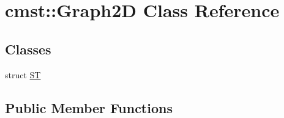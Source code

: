 \hypertarget{classcmst_1_1_graph2_d}{}\section{cmst\+:\+:Graph2D Class Reference}
\label{classcmst_1_1_graph2_d}
\subsection*{Classes}
\begin{DoxyCompactItemize}
\item 
struct \hyperlink{structcmst_1_1_graph2_d_1_1_s_t}{ST}
\end{DoxyCompactItemize}
\subsection*{Public Member Functions}
